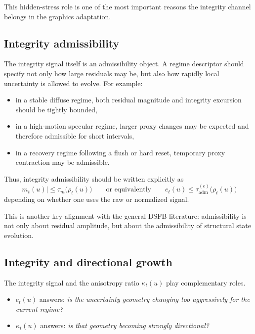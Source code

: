 \documentclass[11pt,letterpaper]{article}
\theoremstyle{gcresult}
\theoremstyle{definition}
\begin{document}
This hidden-stress role is one of the most important reasons the integrity channel belongs in the graphics adaptation.


\subsection{Integrity admissibility}

The integrity signal itself is an admissibility object. A regime descriptor should specify not only how large residuals may be, but also how rapidly local uncertainty is allowed to evolve. For example:
\begin{itemize}[leftmargin=1.5em]
    \item in a stable diffuse regime, both residual magnitude and integrity excursion should be tightly bounded,
    \item in a high-motion specular regime, larger proxy changes may be expected and therefore admissible for short intervals,
    \item in a recovery regime following a flush or hard reset, temporary proxy contraction may be admissible.
\end{itemize}

Thus, integrity admissibility should be written explicitly as
\begin{equation}
|m_t(u)|\le \tau_m\bigl(\rho_t(u)\bigr)
\qquad \text{or equivalently} \qquad
e_t(u)\le \tau^{(e)}_{\mathrm{adm}}\bigl(\rho_t(u)\bigr)
\end{equation}
depending on whether one uses the raw or normalized signal.

This is another key alignment with the general DSFB literature: admissibility is not only about residual amplitude, but about the admissibility of structural state evolution. 


\subsection{Integrity and directional growth}

The integrity signal and the anisotropy ratio $\kappa_t(u)$ play complementary roles.

\begin{itemize}[leftmargin=1.5em]
    \item $e_t(u)$ answers: \emph{is the uncertainty geometry changing too aggressively for the current regime?}
    \item $\kappa_t(u)$ answers: \emph{is that geometry becoming strongly directional?}
\end{itemize}
\end{document}
